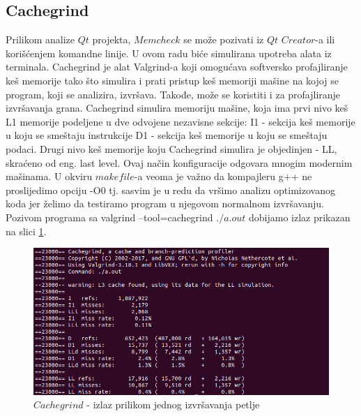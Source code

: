 \documentclass[a4paper]{article}
\begin{document}
	\subsection{Cachegrind}
	Prilikom analize $Qt$ projekta, $Memcheck$ se može pozivati iz $Qt$ $Creator$-a ili korišćenjem komandne linije. U ovom radu biće simulirana upotreba alata iz terminala. 
Cachegrind je alat Valgrind-a koji omogućava softversko profajliranje keš memorije tako što simulira i prati pristup keš memoriji mašine na kojoj se program, koji se analizira, izvršava. Takođe, može se koristiti i za profajliranje izvršavanja grana.  \cite{verifikacija1}
Cachegrind simulira memoriju mašine, koja ima prvi nivo keš L1 memorije podeljene u dve odvojene nezavisne sekcije: I1 - sekcija keš memorije u koju se smeštaju instrukcije D1 - sekcija keš memorije u koju se smeštaju podaci. Drugi nivo keš memorije koju Cachegrind simulira je objedinjen - LL, skraćeno od eng. last level. Ovaj način konfiguracije odgovara mnogim modernim mašinama. \cite{verifikacija2}
U okviru $makefile$-a veoma je važno da  kompajleru g++ ne proslijedimo opciju  -O0 tj. sasvim je u redu da vršimo analizu optimizovanog koda jer želimo da testiramo program u njegovom normalnom izvršavanju. Pozivom programa sa valgrind --tool=cachegrind $./a.out$ dobijamo izlaz prikazan na slici \ref{fig:cache1}.
	\begin{figure}[h!]
		\caption{$Cachegrind$ - izlaz prilikom jednog izvršavanja petlje}
		\label{fig:cache1}
		\includegraphics[scale=0.5]{../Valgrind/Cachegrind/cache1.png}
	\end{figure}
\end{document}
